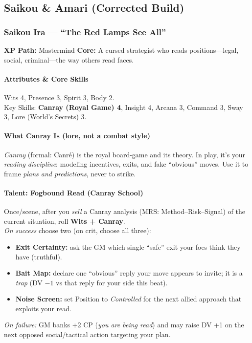 
\subsection{Saikou \& Amari (Corrected Build)}

\subsubsection{Saikou Ira — “The Red Lamps See All”}
\textbf{XP Path:} Mastermind \quad
\textbf{Core:} A cursed strategist who reads positions—legal, social, criminal—the way others read faces.

\paragraph{Attributes \& Core Skills}
Wits 4, Presence 3, Spirit 3, Body 2.\\
Key Skills: \textbf{Canray (Royal Game) 4}, Insight 4, Arcana 3, Command 3, Sway 3, Lore (World’s Secrets) 3.

\paragraph{What Canray Is (lore, not a combat style)}
\emph{Canray} (formal: Canré) is the royal board-game and its theory. In play, it’s your \emph{reading discipline}: modeling incentives, exits, and fake “obvious” moves. Use it to frame \emph{plans and predictions}, never to strike.

\paragraph{Talent: Fogbound Read (Canray School)}
Once/scene, after you \emph{sell} a Canray analysis (MRS: Method–Risk–Signal) of the current situation, roll \textbf{Wits + Canray}.\\
\emph{On success} choose two (on crit, choose all three):
\begin{itemize}
  \item \textbf{Exit Certainty:} ask the GM which single “safe” exit your foes think they have (truthful).
  \item \textbf{Bait Map:} declare one “obvious” reply your move appears to invite; it is a \emph{trap} (DV $-1$ vs that reply for your side this beat).
  \item \textbf{Noise Screen:} set Position to \emph{Controlled} for the next allied approach that exploits your read.
\end{itemize}
\emph{On failure:} GM banks +2 CP (\emph{you are being read}) and may raise DV +1 on the next opposed social/tactical action targeting your plan.

